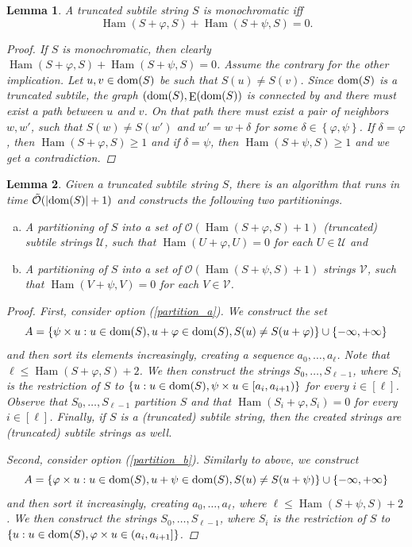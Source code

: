 \documentclass[11pt, letterpaper]{article}
\theoremstyle{plain}
\newtheorem{lemma}{Lemma}
\theoremstyle{definition}
\theoremstyle{remark}
\renewcommand{\O}{\mathcal{O}}
\newcommand{\tO}{\tilde{\mathcal{O}}}
\newcommand{\U}{\mathcal{U}}
\newcommand{\V}{\mathcal{V}}
\renewcommand{\phi}{\varphi}
\newcommand{\set}[1]{\left\lbrace #1 \right\rbrace}
\DeclareMathOperator*{\Edges}{E}
\DeclareMathOperator*{\Ham}{Ham}
\newcommand{\absolute}[1]{\left\lvert#1\right\rvert}
\begin{document}
\begin{lemma}\label{monochromacy_condition}
	A truncated subtile string $S$ is monochromatic iff
	\[\Ham(S + \phi, S) + \Ham(S + \psi, S) = 0.\]
	\begin{proof}
		If $S$ is monochromatic, then clearly $\Ham(S + \phi, S) + \Ham(S + \psi, S) = 0$.
		Assume the contrary for the other implication.
		Let $u, v \in \operatorname*{dom}(S)$ be such that $S(u) \neq S(v)$.
		Since $\operatorname*{dom}(S)$ is a truncated subtile, the graph $(\d{S}, \Edges(\d{S})$ is connected by  and there must exist a path between $u$ and $v$.
		On that path there must exist a pair of neighbors $w, w'$, such that $S(w) \neq S(w')$ and $w' = w + \delta$ for some $\delta \in \set{\phi, \psi}$.
		If $\delta = \phi$, then $\Ham(S + \phi, S) \ge 1$ and if $\delta = \psi$, then $\Ham(S + \psi, S) \ge 1$ and we get a contradiction.
	\end{proof}
\end{lemma}


\begin{lemma}\label{cut_partitioning}
Given a truncated subtile string $S$, there is an algorithm that runs in time $\tO(\absolute{\d{S}} + 1)$ and constructs the following two partitionings.
	\begin{enumerate}[(a)]
		\item A partitioning of $S$ into a set of $\O(\Ham(S + \phi, S) + 1)$ (truncated) subtile strings $\U$, such that $\Ham(U + \phi, U) = 0$ for each $U \in \U$ and \label{partition_a}
		\item A partitioning of $S$ into a set of $\O(\Ham(S + \psi, S) + 1)$ strings $\V$, such that $\Ham(V + \psi, V) = 0$ for each $V \in \V$. \label{partition_b}
	\end{enumerate}
	\begin{proof}
		First, consider option (\ref{partition_a}). We construct the set
		\[ A = \set{\s{u} : u \in \d{S}, u + \phi \in \d{S}, S(u) \neq S(u + \phi)} \cup \set{-\infty, +\infty}\]
		and then sort its elements increasingly, creating a sequence $a_0, \dots, a_\ell$.
		Note that $\ell \le \Ham(S + \phi, S) + 2$.
		We then construct the strings $S_0, \dots, S_{\ell - 1}$, where $S_i$ is the restriction of $S$ to
		$\set{u : u \in \d{S}, \s{u} \in [a_i, a_{i + 1})}$ for every $i \in [\ell]$.
		Observe that $S_0, \dots, S_{\ell - 1}$ partition $S$ and that $\Ham(S_i + \phi, S_i) = 0$ for every $i \in [\ell]$. Finally, if $S$ is a (truncated) subtile string, then the created strings are (truncated) subtile strings as well.
	
		Second, consider option (\ref{partition_b}). Similarly to above, we construct
		\[ A = \set{\h{u} : u \in \d{S}, u + \psi \in \d{S}, S(u) \neq S(u + \psi)} \cup \set{-\infty, +\infty} \]
		and then sort it increasingly, creating $a_0, \dots, a_\ell$, where $\ell \le \Ham(S + \psi, S) + 2$.
		We then construct the strings $S_0, \dots, S_{\ell - 1}$, where $S_i$ is the restriction of $S$ to 
		$\set{u : u \in \d{S}, \h{u} \in (a_i, a_{i + 1}]}$.
	\end{proof}
\end{lemma}
\end{document}

